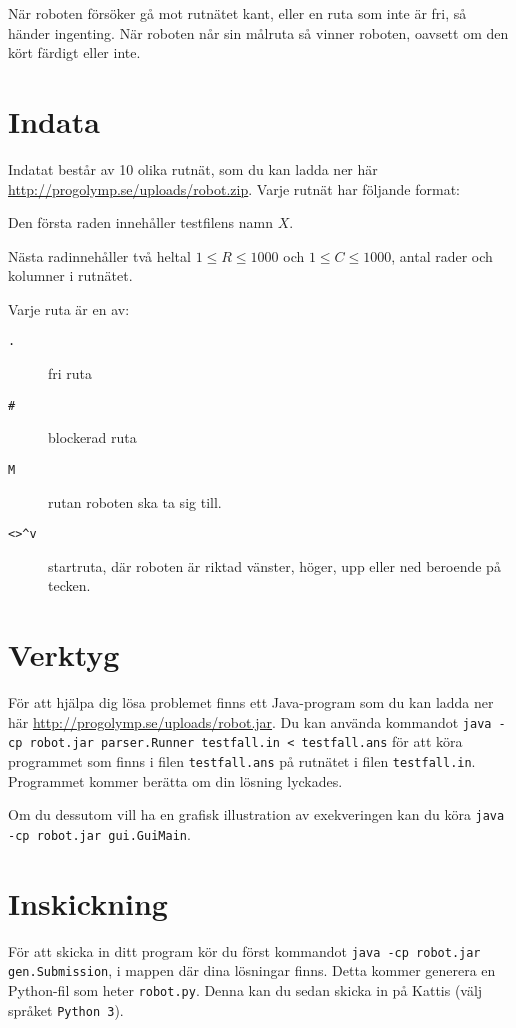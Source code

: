 När roboten försöker gå mot rutnätet kant, eller en ruta som inte är fri, så händer ingenting. När roboten når sin målruta så vinner roboten, oavsett om den kört färdigt eller inte.

\section*{Indata}
Indatat består av 10 olika rutnät, som du kan ladda ner här \url{http://progolymp.se/uploads/robot.zip}. Varje rutnät har följande format:

Den första raden innehåller testfilens namn $X$.

Nästa radinnehåller två heltal $1 \le R \le 1000$ och $1 \le C \le 1000$, antal rader och kolumner i rutnätet.

Varje ruta är en av:
\begin{description}
  \item[\texttt{.}] fri ruta
  \item[\texttt{\#}] blockerad ruta
  \item[\texttt{M}] rutan roboten ska ta sig till.
  \item[\texttt{<>\^{}v}] startruta, där roboten är riktad vänster, höger, upp eller ned beroende på tecken.
\end{description}

\section*{Verktyg}
För att hjälpa dig lösa problemet finns ett Java-program som du kan ladda ner här \url{http://progolymp.se/uploads/robot.jar}. Du kan använda kommandot \texttt{java -cp robot.jar parser.Runner testfall.in < testfall.ans} för att köra programmet som finns i filen \texttt{testfall.ans} på rutnätet i filen \texttt{testfall.in}. Programmet kommer berätta om din lösning lyckades.

Om du dessutom vill ha en grafisk illustration av exekveringen kan du köra \texttt{java -cp robot.jar gui.GuiMain}.

\section*{Inskickning}
För att skicka in ditt program kör du först kommandot \texttt{java -cp robot.jar gen.Submission}, i mappen där dina lösningar finns. Detta kommer generera en Python-fil som heter \texttt{robot.py}. Denna kan du sedan skicka in på Kattis (välj språket \texttt{Python 3}).

